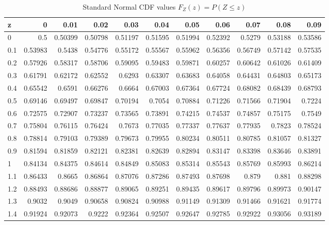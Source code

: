 \documentclass[twoside]{book}
\begin{document}
\begin{table}[!h]
\centering
\footnotesize
\caption{\small Standard Normal CDF values $F_Z(z)=P(Z\le z)$}
\label{table:Ztable}
\begin{tabular}{l|*{10}{r}}
\toprule
z   & 0       & 0.01    & 0.02    & 0.03    & 0.04    & 0.05    & 0.06    & 0.07    & 0.08    & 0.09    \\
\midrule
0   & 0.5     & 0.50399 & 0.50798 & 0.51197 & 0.51595 & 0.51994 & 0.52392 & 0.5279  & 0.53188 & 0.53586 \\
0.1 & 0.53983 & 0.5438  & 0.54776 & 0.55172 & 0.55567 & 0.55962 & 0.56356 & 0.56749 & 0.57142 & 0.57535 \\
0.2 & 0.57926 & 0.58317 & 0.58706 & 0.59095 & 0.59483 & 0.59871 & 0.60257 & 0.60642 & 0.61026 & 0.61409 \\
0.3 & 0.61791 & 0.62172 & 0.62552 & 0.6293  & 0.63307 & 0.63683 & 0.64058 & 0.64431 & 0.64803 & 0.65173 \\
0.4 & 0.65542 & 0.6591  & 0.66276 & 0.6664  & 0.67003 & 0.67364 & 0.67724 & 0.68082 & 0.68439 & 0.68793 \\
0.5 & 0.69146 & 0.69497 & 0.69847 & 0.70194 & 0.7054  & 0.70884 & 0.71226 & 0.71566 & 0.71904 & 0.7224  \\
0.6 & 0.72575 & 0.72907 & 0.73237 & 0.73565 & 0.73891 & 0.74215 & 0.74537 & 0.74857 & 0.75175 & 0.7549  \\
0.7 & 0.75804 & 0.76115 & 0.76424 & 0.7673  & 0.77035 & 0.77337 & 0.77637 & 0.77935 & 0.7823  & 0.78524 \\
0.8 & 0.78814 & 0.79103 & 0.79389 & 0.79673 & 0.79955 & 0.80234 & 0.80511 & 0.80785 & 0.81057 & 0.81327 \\
0.9 & 0.81594 & 0.81859 & 0.82121 & 0.82381 & 0.82639 & 0.82894 & 0.83147 & 0.83398 & 0.83646 & 0.83891 \\
1   & 0.84134 & 0.84375 & 0.84614 & 0.84849 & 0.85083 & 0.85314 & 0.85543 & 0.85769 & 0.85993 & 0.86214 \\
1.1 & 0.86433 & 0.8665  & 0.86864 & 0.87076 & 0.87286 & 0.87493 & 0.87698 & 0.879   & 0.881   & 0.88298 \\
1.2 & 0.88493 & 0.88686 & 0.88877 & 0.89065 & 0.89251 & 0.89435 & 0.89617 & 0.89796 & 0.89973 & 0.90147 \\
1.3 & 0.9032  & 0.9049  & 0.90658 & 0.90824 & 0.90988 & 0.91149 & 0.91309 & 0.91466 & 0.91621 & 0.91774 \\
1.4 & 0.91924 & 0.92073 & 0.9222  & 0.92364 & 0.92507 & 0.92647 & 0.92785 & 0.92922 & 0.93056 & 0.93189 \\

\end{tabular}
\end{table}
\end{document}
